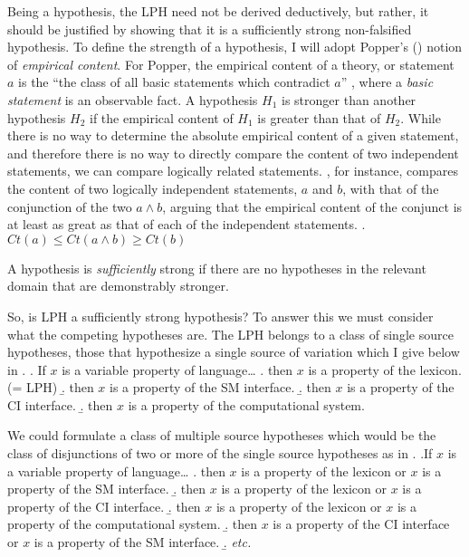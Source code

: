 \documentclass[MilwayThesis]{subfiles}
\begin{document}
Being a hypothesis, the LPH need not be derived deductively, but rather, it should be justified by showing that it is a sufficiently strong non-falsified hypothesis.
To define the strength of a hypothesis, I will adopt Popper's (\citeyear{popper1959logic,popper2014conjectures}) notion of \textit{empirical content}.
For Popper, the empirical content of a theory, or statement $a$ is the ``the class of all basic statements which contradict $a$'' \parencite[315]{popper2014conjectures}, where a \textit{basic statement} is an observable fact.
A hypothesis $H_1$ is stronger than another hypothesis $H_2$ if the empirical content of $H_1$ is greater than that of $H_2$.
While there is no way to determine the absolute empirical content of a given statement, and therefore there is no way to directly compare the content of two independent statements, we can compare logically related statements.
\textcite[295]{popper2014conjectures}, for instance, compares the content of two logically independent statements, $a$ and $b$, with that of the conjunction of the two $a\wedge b$, arguing that the empirical content of the conjunct is at least as great as that of each of the independent statements.
\ex. $Ct(a) \leq Ct(a\wedge b) \geq Ct(b)$

A hypothesis is \textit{sufficiently} strong if there are no hypotheses in the relevant domain that are demonstrably stronger.

So, is LPH a sufficiently strong hypothesis?
To answer this we must consider what the competing hypotheses are.
The LPH belongs to a class of single source hypotheses, those that hypothesize a single source of variation which I give below in \Next.
\ex. If $x$ is a variable property of language\ldots
\a. then $x$ is a property of the lexicon. (= LPH)
\b. then $x$ is a property of the SM interface.
\b. then $x$ is a property of the CI interface.
\b. then $x$ is a property of the computational system.

We could formulate a class of multiple source hypotheses which would be the class of disjunctions of two or more of the single source hypotheses as in \Next.
\ex.If $x$ is a variable property of language\ldots
\a. then $x$ is a property of the lexicon or $x$ is a property of the SM interface.
\b. then $x$ is a property of the lexicon or $x$ is a property of the CI interface. 
\b. then $x$ is a property of the lexicon or $x$ is a property of the computational system. 
\b. then $x$ is a property of the CI interface or $x$ is a property of the SM interface.
\b. \textit{etc.} 
\end{document}
